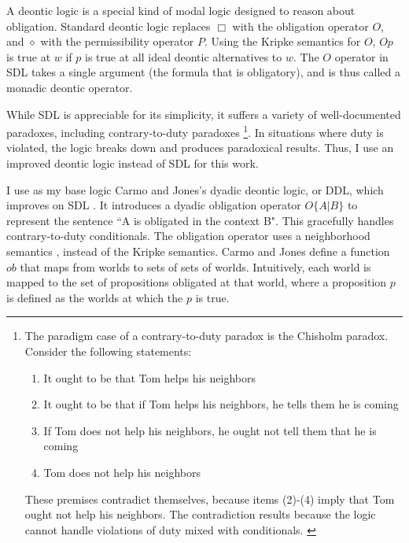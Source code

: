 \begin{isabellebody}
\begin{isamarkuptext}
A deontic logic is a special kind of modal logic designed to reason about obligation. Standard deontic
logic \citep{cresswell, sep-logic-deontic} replaces $\Box$ with the obligation operator
$O$, and $\diamond$ with the permissibility operator $P$. Using the Kripke semantics for $O$, $O p$ 
is true at $w$ if $p$ is true at all  ideal deontic alternatives to $w$. The $O$ operator in SDL
takes a single argument (the formula that is obligatory), and is thus called a monadic deontic operator.

 While SDL is appreciable for its simplicity, it suffers a variety of well-documented paradoxes, 
including contrary-to-duty paradoxes \footnote{The paradigm case of a contrary-to-duty paradox is the 
Chisholm paradox. Consider the following statements: \begin{enumerate}
\item It ought to be that Tom helps his neighbors
\item It ought to be that if Tom helps his neighbors, he tells them he is coming
\item If Tom does not help his neighbors, he ought not tell them that he is coming
\item Tom does not help his neighbors
\end{enumerate} 
These premises contradict themselves, because items (2)-(4) imply that Tom ought not help his neighbors. The 
contradiction results because the logic cannot handle violations of duty mixed with
conditionals. \citep{chisholm, ctd}
}. 
In situations where duty is violated, the logic breaks down 
and produces paradoxical results. Thus, I use an improved deontic logic instead of SDL for this work.%
\end{isamarkuptext}\isamarkuptrue%
%
\isadelimdocument
%
\endisadelimdocument
%
\isatagdocument
%
\isamarkuptrue%
%
\endisatagdocument
{\isafolddocument}%
%
\isadelimdocument
%
\endisadelimdocument
%
\begin{isamarkuptext}%
I use as my base logic Carmo and Jones's dyadic deontic logic, or DDL, which improves on SDL \cite{CJDDL}. 
It introduces a dyadic obligation operator $O\{A \vert B\}$ 
to represent the sentence ``A is obligated in the context B". This gracefully handles contrary-to-duty
conditionals. The obligation operator uses a neighborhood semantics \cite{neighborhood1, neighborhood2}, instead of the Kripke semantics. 
Carmo and Jones define a function $ob$ that maps from worlds to sets of sets of worlds. Intuitively, 
each world is mapped to the set of propositions obligated at that world, where a proposition $p$ is defined as 
the worlds at which the $p$ is true.


\end{isamarkuptext}
\end{isabellebody}
